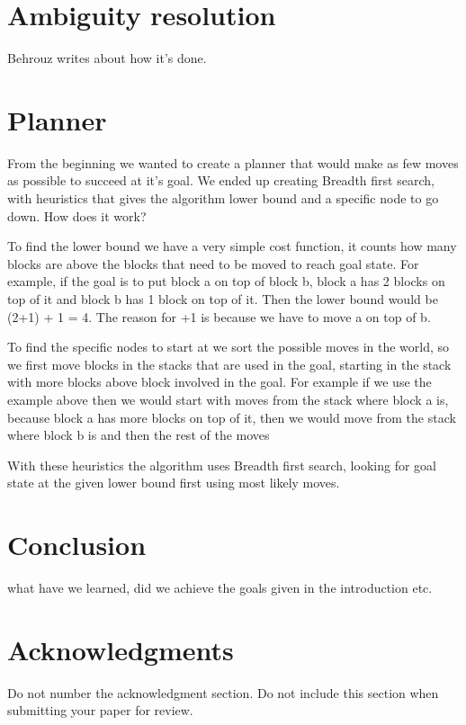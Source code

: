 \documentclass[11pt]{article}
\begin{document}
\section*{Ambiguity resolution}
Behrouz writes about how it's done.

\section*{Planner}
From the beginning we wanted to create a planner that would make as few moves as possible to succeed at it's goal. We ended up creating Breadth first search, with heuristics that gives the algorithm lower bound and a specific node to go down. How does it work?

To find the lower bound we have a very simple cost function, it counts how many blocks are above the blocks that need to be moved to reach goal state. For example, if the goal is to put block a on top of block b, block a has 2 blocks on top of it and block b has 1 block on top of it. Then the lower bound would be (2+1) + 1 = 4. The reason for +1 is because we have to move a on top of b. 

To find the specific nodes to start at we sort the possible moves in the world, so we first move blocks in the stacks that are used in the goal, starting in the stack with more blocks above block involved in the goal. For example if we use the example above then we would  start with moves from the stack where block a is, because block a has more blocks on top of it, then we would move from the stack where block b is and then the rest of the moves

With these heuristics the algorithm uses Breadth first search, looking for goal state at the given lower bound first using most likely moves.

\section*{Conclusion}
 what have we learned, did we achieve the goals given in the introduction etc.

\section*{Acknowledgments}

Do not number the acknowledgment section. Do not include this section
when submitting your paper for review.



\end{document}

